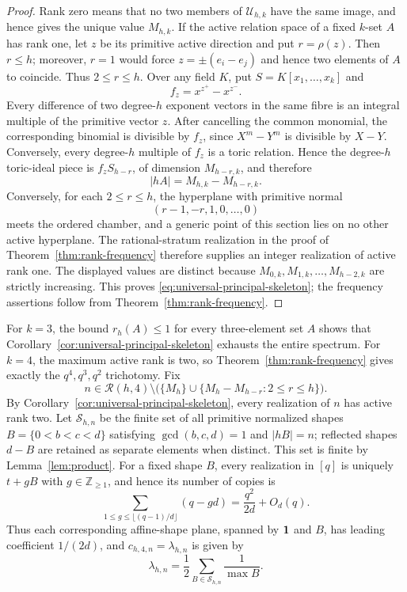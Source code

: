 \documentclass[11pt,reqno]{amsart}
\theoremstyle{definition}
\theoremstyle{remark}
\newcommand{\Rcal}{\mathcal R}
\begin{document}
\begin{proof}
Rank zero means that no two members of $\mathcal U_{h,k}$ have the same
image, and hence gives the unique value $M_{h,k}$.  If the active relation
space of a fixed $k$-set $A$ has rank one, let $z$ be its primitive active
direction and put $r=\rho(z)$.  Then $r\leq h$; moreover, $r=1$ would force
$z=\pm(e_i-e_j)$ and hence two elements of $A$ to coincide.  Thus
$2\leq r\leq h$.  Over any field $K$,
put
$S=K[x_1,\ldots,x_k]$ and
\[
 f_z=x^{z^+}-x^{z^-}.
\]
Every difference of two degree-$h$ exponent vectors in the same fibre is an
integral multiple of the primitive vector $z$.  After cancelling the common
monomial, the corresponding binomial is divisible by $f_z$, since
$X^m-Y^m$ is divisible by $X-Y$.  Conversely, every degree-$h$ multiple of
$f_z$ is a toric relation.  Hence the degree-$h$ toric-ideal piece is
$f_zS_{h-r}$, of dimension $M_{h-r,k}$, and therefore
\[
 |hA|=M_{h,k}-M_{h-r,k}.
\]
Conversely, for each $2\leq r\leq h$, the hyperplane with primitive normal
\[
 (r-1,-r,1,0,\ldots,0)
\]
meets the ordered chamber, and a generic point of this section lies on no
other active hyperplane.  The rational-stratum realization in the proof of
Theorem~\ref{thm:rank-frequency} therefore supplies an integer realization
of active rank one.  The displayed values are distinct because
$M_{0,k},M_{1,k},\ldots,M_{h-2,k}$ are strictly increasing.  This proves
\eqref{eq:universal-principal-skeleton}; the frequency assertions follow
from Theorem~\ref{thm:rank-frequency}.
\end{proof}

For $k=3$, the bound $r_h(A)\leq1$ for every three-element set $A$ shows that
Corollary~\ref{cor:universal-principal-skeleton} exhausts the entire
spectrum.  For $k=4$, the maximum active rank is two, so
Theorem~\ref{thm:rank-frequency} gives exactly the
$q^4,q^3,q^2$ trichotomy.  Fix
\[
 n\in\Rcal(h,4)\setminus
 \bigl(\{M_h\}\cup\{M_h-M_{h-r}:2\leq r\leq h\}\bigr).
\]
By Corollary~\ref{cor:universal-principal-skeleton}, every realization of
$n$ has active rank two.  Let $\mathcal S_{h,n}$ be the finite set of all
primitive normalized shapes $B=\{0<b<c<d\}$ satisfying
$\gcd(b,c,d)=1$ and $|hB|=n$; reflected shapes $d-B$ are retained as
separate elements when distinct.  This set is finite by
Lemma~\ref{lem:product}.  For a fixed shape $B$, every realization in
$[q]$ is uniquely $t+gB$ with $g\in\mathbb Z_{\geq1}$, and hence its
number of copies is
\[
 \sum_{1\leq g\leq\lfloor(q-1)/d\rfloor}(q-gd)
 =\frac{q^2}{2d}+O_d(q).
\]
Thus each corresponding affine-shape plane, spanned by ${\bf1}$ and $B$,
has leading coefficient $1/(2d)$, and
$c_{h,4,n}=\lambda_{h,n}$ is given by
\[
 \lambda_{h,n}=\frac12\sum_{B\in\mathcal S_{h,n}}\frac1{\max B}.
\]
\end{document}
